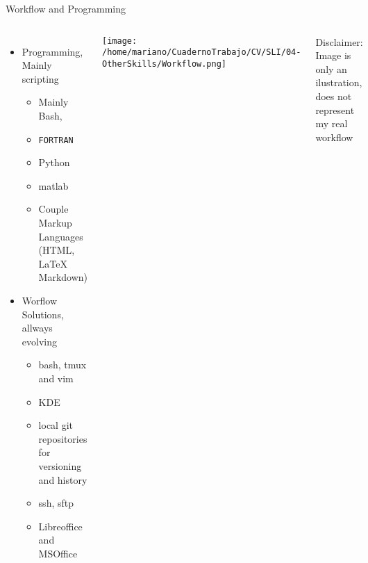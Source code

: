 \begin{frame}{Workflow and Programming}

  \begin{columns}
    \begin{itemize}
    \small
      \item Programming, Mainly scripting
	\begin{itemize}
    \small
	  \item Mainly Bash,
	  \item \texttt{FORTRAN}
	  \item Python
	  \item matlab
	  \item Couple Markup Languages (HTML, \LaTeX\, Markdown)
	\end{itemize}
	\item Worflow Solutions, allways evolving
	  \begin{itemize}
    \small
	    \item bash, tmux and vim
	    \item KDE
	    \item local git repositories for versioning and history
	    \item ssh, sftp 
	    \item Libreoffice and MSOffice
	  \end{itemize}
  \end{itemize}
    \texttt{[image: /home/mariano/CuadernoTrabajo/CV/SLI/04-OtherSkills/Workflow.png]}

\tiny
Disclaimer:  Image is only an ilustration, does not represent my real workflow
  \end{columns}

\end{frame}
